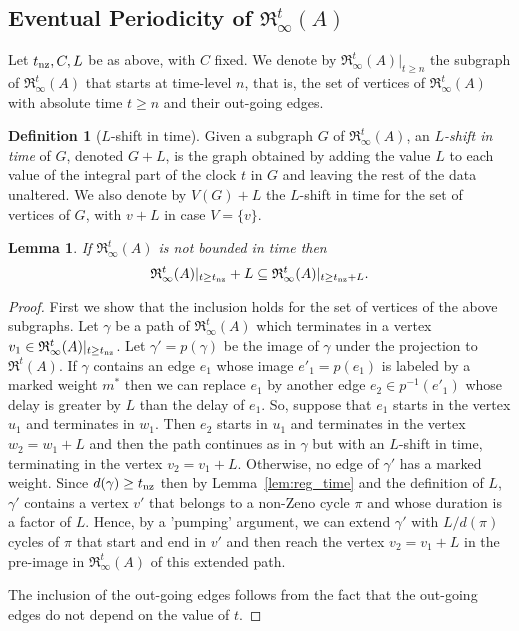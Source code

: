 \documentclass[11pt]{amsart}
\newtheorem{lemma}[theorem]{Lemma}
\theoremstyle{definition}
\newtheorem{definition}[theorem]{Definition}
\newcommand{\ARRR}{\mathfrak{R}^t}
\newcommand{\IARRR}{\mathfrak{R}_{\infty}^{t}}
\begin{document}
\subsection{Eventual Periodicity of $\IARRR(A)$}
Let $t_{\textnormal{nz}}, C, L$ be as above, with $C$ fixed.
We denote by $\IARRR(A)|_{t \geq n}$ the subgraph of $\IARRR(A)$ that starts at time-level $n$, that is, the set of vertices of $\IARRR(A)$ with absolute time $t \geq n$ and their out-going edges.
\begin{definition}[$L$-shift in time]
	Given a subgraph $G$ of $\IARRR(A)$, an \emph{$L$-shift in time} of $G$, denoted $G+L$, is the graph obtained by adding the value $L$ to each value of the integral part of the clock $t$ in $G$ and leaving the rest of the data unaltered.
	We also denote by $V(G)+L$ the $L$-shift in time for the set of vertices of $G$, with $v+L$ in case $V = \{v\}$.
\end{definition}
\begin{lemma}
	\label{lem:forward_period}
	If $\IARRR(A)$ is not bounded in time then 
	$$\IARRR(A)|_{t \geq t_\textnormal{nz}} + L \subseteq \IARRR(A)|_{t \geq t_\textnormal{nz}+L}.$$
\end{lemma}
\begin{proof}
	First we show that the inclusion holds for the set of vertices of the above subgraphs.
	Let $\gamma$ be a path of $\IARRR(A)$ which terminates in a vertex $v_1 \in \IARRR(A)|_{t \geq t_\textnormal{nz}}$.
	Let $\gamma' = p(\gamma)$ be the image of $\gamma$ under the projection to $\ARRR(A)$.
	If $\gamma$ contains an edge $e_1$ whose image $e'_1=p(e_1)$ is labeled by a marked weight $m^*$ then we can replace $e_1$ by another edge $e_2 \in p^{-1}(e'_1)$ whose delay is greater by $L$ than the delay of $e_1$.
	So, suppose that $e_1$ starts in the vertex $u_1$ and terminates in $w_1$. Then $e_2$ starts in $u_1$ and terminates in the vertex $w_2=w_1+L$ and then the path continues as in $\gamma$ but with an $L$-shift in time, terminating in the vertex $v_2=v_1 +L$.
Otherwise, no edge of $\gamma'$ has a marked weight.
	Since $d(\gamma) \geq t_{\textnormal{nz}}$ then by Lemma~\ref{lem:reg_time} and the definition of $L$, $\gamma'$ contains a vertex $v'$ that belongs to a non-Zeno cycle $\pi$ and whose duration is a factor of $L$.
	Hence, by a 'pumping' argument, we can extend $\gamma'$ with $L / d(\pi)$ cycles of $\pi$ that start and end in $v'$ and then reach the vertex $v_2 = v_1 +L$ in the pre-image in $\IARRR(A)$ of this extended path.
	
	The inclusion of the out-going edges follows from the fact that the out-going edges do not depend on the value of $t$.
\end{proof}
\end{document}
